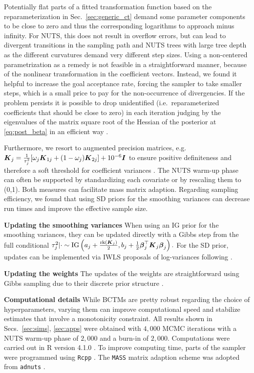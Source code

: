 \documentclass[12pt]{article}
\theoremstyle{plain}
\begin{document}
Potentially  flat parts of a fitted transformation function based on the reparameterization in Sec.~\ref{sec:generic_ct} demand some parameter components to be close to zero and thus the corresponding logarithms to approach minus infinity. For NUTS, this does not result in overflow errors, but can lead to divergent transitions in the sampling path and NUTS trees with large tree depth as the different curvatures demand very different step sizes. Using a non-centered parametrization \citep{papaspiliopoulos2007general} as a remedy is not feasible in a straightforward manner, because of the nonlinear transformation in the coefficient vectors.  Instead, we found it helpful to increase the goal acceptance rate, forcing the sampler to take smaller steps, which is a small price to pay for the non-occurrence of divergencies. If the problem persists it is possible to drop unidentified (i.e.~reparameterized coefficients that should be close to zero) in each iteration judging by the eigenvalues of the matrix square root of the Hessian of the posterior at \eqref{eq:post_beta} in an efficient way \citep{pyawood}. 

Furthermore, we resort to  augmented precision matrices, e.g.~$\text{\boldmath$K$}_{j} =\frac{1}{\tau_{j}^2}[\omega_j\text{\boldmath$K$}_{1j} + (1-\omega_j)\text{\boldmath$K$}_{2j}] + 10^{-6}\text{\boldmath$I$}$ to ensure positive definiteness and therefore a soft threshold for  coefficient variances \citep{andrinopoulou2018improved}. The NUTS warm-up phase can often be supported by standardizing each covariate or by rescaling them to (0,1). Both measures can facilitate mass matrix adaption. Regarding sampling efficiency, we found that using SD priors for the smoothing variances can decrease run times and improve the effective sample size.


\noindent\textbf{Updating the smoothing variances}
When using an IG prior for the smoothing variances, they can be updated directly with a Gibbs step from the full conditional
$\tau_{j}^2 | \cdot \sim \mathrm{IG}\left(a_{j} + \frac{\mathrm{rk}(\text{\boldmath$K$}_{j})}{2}, b_{j} + \frac{1}{2} \text{\boldmath$\beta$}_j^\top \text{\boldmath$K$}_{j} \text{\boldmath$\beta$}_{j} \right).$
For the SD prior, updates can be implemented via IWLS proposals of log-variances following  \citet{KleKne2016}. 

\noindent\textbf{Updating the weights}
The updates of the weights are straightforward using Gibbs sampling due to their discrete prior structure \citep{kneib2019modular}.

\noindent\textbf{Computational details}
While BCTMs are pretty robust regarding the choice of  hyperparameters, varying them can improve computational speed and stabilize estimates that involve a monotonicity constraint. All results shown in Secs.~\ref{sec:sims}, \ref{sec:apps} were obtained with $4,000$ MCMC iterations with a NUTS warm-up phase of $2,000$ and a burn-in  of  $2,000$.
 Computations were carried out in R version 4.1.0 \citep{Rlang}. To improve computing time, parts of the sampler were programmed using  \texttt{Rcpp} \citep{Rcpp}. The \texttt{MASS} matrix adaption scheme was adopted from  \texttt{adnuts} \citep{adnuts}. 
\end{document}
